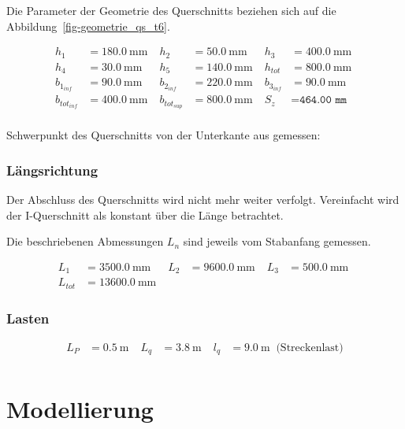 \documentclass[
  11pt,
  letterpaper,
]{scrreprt}
\begin{document}
Die Parameter der Geometrie des Querschnitts beziehen sich auf die
Abbildung~\ref{fig-geometrie_qs_t6}.

$$
\begin{aligned}
h_{1} &= 180.0\ \mathrm{mm} \; 
 &h_{2} &= 50.0\ \mathrm{mm} \; 
 &h_{3} &= 400.0\ \mathrm{mm} \; 
\\[10pt]
 h_{4} &= 30.0\ \mathrm{mm} \; 
 &h_{5} &= 140.0\ \mathrm{mm} \; 
 &h_{tot} &= 800.0\ \mathrm{mm} \; 
\\[10pt]
 b_{1_{inf}} &= 90.0\ \mathrm{mm} \; 
 &b_{2_{inf}} &= 220.0\ \mathrm{mm} \; 
 &b_{3_{inf}} &= 90.0\ \mathrm{mm} \; 
\\[10pt]
 b_{tot_{inf}} &= 400.0\ \mathrm{mm} \; 
 &b_{tot_{sup}} &= 800.0\ \mathrm{mm} \; 
 &S_{z} &= \mathtt{\text{464.00 mm}} \; 
\\[10pt]
\end{aligned}
$$

Schwerpunkt des Querschnitts von der Unterkante aus gemessen:

\subsubsection{Längsrichtung}\label{luxe4ngsrichtung}

Der Abschluss des Querschnitts wird nicht mehr weiter verfolgt.
Vereinfacht wird der I-Querschnitt als konstant über die Länge
betrachtet.

Die beschriebenen Abmessungen \(L_n\) sind jeweils vom Stabanfang
gemessen.

$$
\begin{aligned}
L_{1} &= 3500.0\ \mathrm{mm} \; 
 &L_{2} &= 9600.0\ \mathrm{mm} \; 
 &L_{3} &= 500.0\ \mathrm{mm} \; 
\\[10pt]
 L_{tot} &= 13600.0\ \mathrm{mm} \;
\end{aligned}
$$

\subsubsection{Lasten}\label{lasten}

$$
\begin{aligned}
L_{P} &= 0.5\ \mathrm{m} \; 
 &L_{q} &= 3.8\ \mathrm{m} \; 
 &l_{q} &= 9.0\ \mathrm{m} \; \;\textrm{(Streckenlast)}
\\[10pt]
\end{aligned}
$$

\section{Modellierung}\label{modellierung-2}
\end{document}
